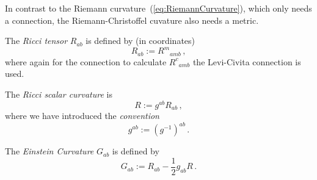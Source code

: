 \documentclass[11pt, a4paper, twocolumn]{article} %
\begin{document}
\begin{note}
    In contrast to the Riemann curvature~(\ref{eq:RiemannCurvature}), 
    which only needs a connection, the Riemann-Christoffel cuvature also needs a metric.
\end{note}
\begin{defn}
    The \textit{Ricci tensor} $R_{ab}$ is defined by (in coordinates)
    \begin{equation}
        R_{ab} := R^m{}_{amb}\,,
    \end{equation}
    where again for the connection to calculate $R^c{}_{amb}$ the Levi-Civita connection is used.
\end{defn}
\begin{defn}
    The \textit{Ricci scalar curvature} is
    \begin{equation}
        R := g^{ab}R_{ab}\,,
    \end{equation}
    where we have introduced the \textit{convention}
    \begin{equation}
        g^{ab} := (g^{-1})^{ab} \,.
    \end{equation}
\end{defn}
\begin{defn}
    The \textit{Einstein Curvature} $G_{ab}$ is defined by
    \begin{equation}
        G_{ab} := R_{ab} - \frac{1}{2} g_{ab} R\,.
    \end{equation}
\end{defn}

    




\printbibliography[title={Bibliography}] %

\end{document}
